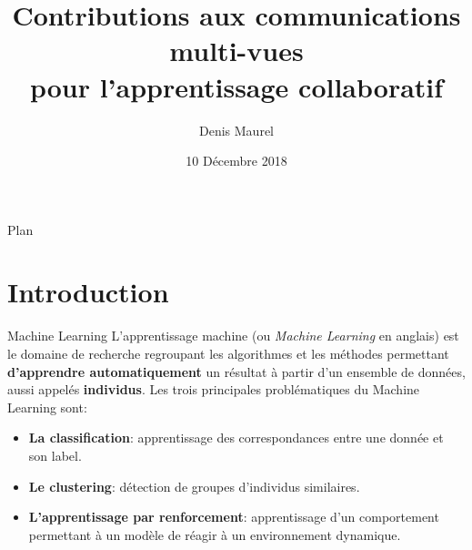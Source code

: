 \documentclass[hyperref={pdfpagelabels=false}]{beamer}
\title{Contributions aux communications multi-vues\\pour l'apprentissage collaboratif}
\date{10 Décembre 2018}
\author{Denis Maurel}
\begin{document}
    \maketitle

    \begin{frame}{Plan}
        \tableofcontents[hideallsubsections]
	\end{frame}

    \section{Introduction}
    \begin{frame}{Machine Learning}
        L'apprentissage machine (ou \textit{Machine Learning} en anglais) est le 
        domaine de recherche regroupant les algorithmes et les méthodes 
        permettant \textbf{d'apprendre automatiquement} un résultat à partir 
        d'un ensemble de données, aussi appelés \textbf{individus}.
        Les trois principales problématiques du Machine Learning sont:
        \begin{itemize}
            \item<2-> {\textbf{La classification}: 
                    apprentissage des correspondances entre une donnée et son 
                label.}
            \item<3-> \textbf{Le clustering}: détection de groupes d'individus 
                similaires.
            \item<4-> {\textbf{L'apprentissage par 
                renforcement}: apprentissage d'un comportement permettant à un 
            modèle de réagir à un environnement dynamique.}
        \end{itemize}
    \end{frame}
\end{document}
